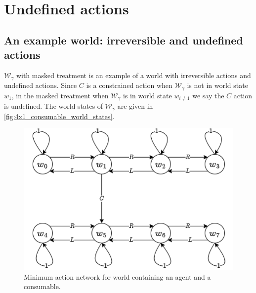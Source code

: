 \section{
Undefined actions
}\label{sec:Undefined actions}


\subsection{An example world: irreversible and undefined actions}

$\mathscr{W}_{\gamma}$ with masked treatment is an example of a world with irreversible actions and undefined actions.
Since $C$ is a constrained action when $\mathscr{W}_{\gamma}$ is not in world state $w_{1}$, in the masked treatment when $\mathscr{W}_{\gamma}$ is in world state $w_{i \neq 1}$ we say the $C$ action is undefined.
The world states of $\mathscr{W}_{\gamma}$ are given in \cref{fig:4x1_consumable_world_states}.

\begin{figure}[H]
    \centering
    \includegraphics[width=\linewidth]{5BeyondSBDRL/GlobalAlgebras/Images/min_actions_world_with_consumable_masked.png}
    \caption{
    Minimum action network for world containing an agent and a consumable.
    }
\end{figure}

